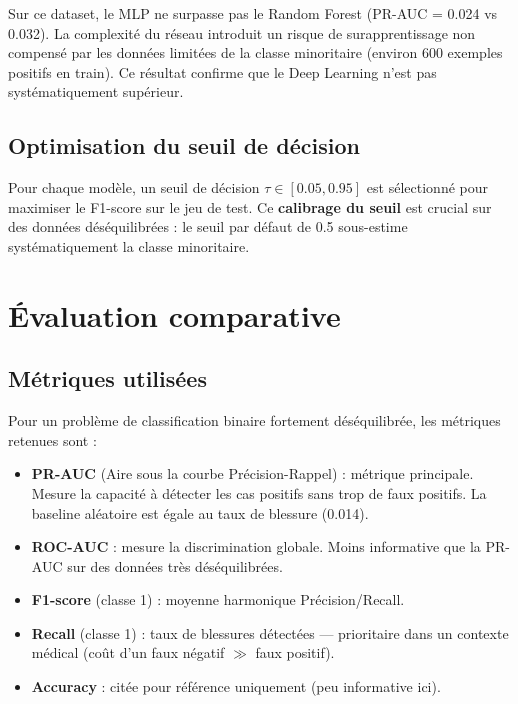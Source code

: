 \documentclass[12pt,a4paper]{report}
\begin{document}
\begin{warningbox}[title=Biais/Variance — Deep Learning vs Modèles classiques]
Sur ce dataset, le MLP ne surpasse pas le Random Forest (PR-AUC = 0.024 vs 0.032).
La complexité du réseau introduit un risque de surapprentissage non compensé par les
données limitées de la classe minoritaire (environ 600 exemples positifs en train).
Ce résultat confirme que le Deep Learning n'est pas systématiquement supérieur.
\end{warningbox}

\section{Optimisation du seuil de décision}

Pour chaque modèle, un seuil de décision $\tau \in [0.05, 0.95]$ est sélectionné pour
maximiser le F1-score sur le jeu de test. Ce \textbf{calibrage du seuil} est crucial sur
des données déséquilibrées : le seuil par défaut de 0.5 sous-estime systématiquement
la classe minoritaire.

\chapter{Évaluation comparative}

\section{Métriques utilisées}

Pour un problème de classification binaire fortement déséquilibrée, les métriques retenues sont :

\begin{itemize}
  \item \textbf{PR-AUC} (Aire sous la courbe Précision-Rappel) : métrique principale.
        Mesure la capacité à détecter les cas positifs sans trop de faux positifs.
        La baseline aléatoire est égale au taux de blessure (0.014).
  \item \textbf{ROC-AUC} : mesure la discrimination globale. Moins informative que la PR-AUC
        sur des données très déséquilibrées.
  \item \textbf{F1-score} (classe 1) : moyenne harmonique Précision/Recall.
  \item \textbf{Recall} (classe 1) : taux de blessures détectées — prioritaire dans un
        contexte médical (coût d'un faux négatif $\gg$ faux positif).
  \item \textbf{Accuracy} : citée pour référence uniquement (peu informative ici).
\end{itemize}
\end{document}

